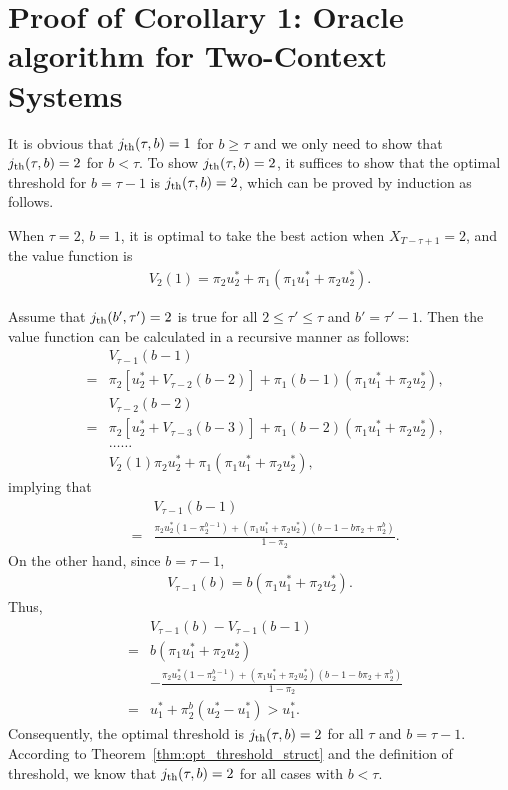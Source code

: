 \section{Proof of Corollary 1: Oracle algorithm for Two-Context Systems}\label{app:proof_opt_two_context}
It is obvious that $j_{\rm th}(\tau, b) = 1$  for $b\geq \tau$ and we only need to show that $j_{\rm th}(\tau, b) = 2$ for $b < \tau$.
To show $j_{\rm th}(\tau, b) = 2$, it suffices to show that the optimal threshold for $b = \tau -1$ is $j_{\rm th}(\tau, b) = 2$,
which can be proved by induction as follows.

When $\tau = 2$, $b = 1$, it is optimal to take the best action when $X_{T-\tau + 1} = 2$, and the value function is
\begin{eqnarray}
V_2(1) = \pi_2 u_2^* + \pi_1(\pi_1 u_1^* + \pi_2 u_2^*).
\end{eqnarray}

Assume that $j_{\rm th}(b', \tau') = 2$ is true for all $2 \leq \tau' \leq \tau$ and $b' = \tau' - 1$.
Then the value function can be calculated in a recursive manner as follows:
\begin{eqnarray}
&& V_{\tau-1}(b-1) \nonumber \\
&=&  \pi_2[u_2^* + V_{\tau-2}(b-2)] + \pi_1 (b-1)(\pi_1 u_1^* + \pi_2 u_2^*),\nonumber\\
&& V_{\tau-2}(b-2) \nonumber \\
&=&  \pi_2[u_2^* + V_{\tau-3}(b-3)] + \pi_1 (b-2)(\pi_1 u_1^* + \pi_2 u_2^*),\nonumber\\
&&\ldots \ldots \nonumber\\
&&V_2(1)  \pi_2 u_2^* + \pi_1(\pi_1 u_1^* + \pi_2 u_2^*),\nonumber
\end{eqnarray}
implying that
\begin{eqnarray}
&&V_{\tau-1}(b-1) \nonumber \\
&=&  \frac{\pi_2 u_2^*(1 - \pi_2^{b-1}) + (\pi_1 u_1^* + \pi_2 u_2^*)(b-1 -b\pi_2 + \pi_2^b)}{1 - \pi_2}. \nonumber
\end{eqnarray}
On the other hand, since $b = \tau -1$,
\begin{eqnarray}
V_{\tau-1}(b) = b(\pi_1 u_1^* + \pi_2 u_2^*).
\end{eqnarray}
Thus,
\begin{eqnarray}
&&{V_{\tau-1}(b) - V_{\tau-1}(b-1)} \nonumber \\
&=&  b(\pi_1 u_1^* + \pi_2 u_2^*) \nonumber \\
&&- \frac{\pi_2 u_2^*(1 - \pi_2^{b-1})   + (\pi_1 u_1^* + \pi_2 u_2^*)(b-1 -b\pi_2 + \pi_2^b)}{1 - \pi_2}\nonumber \\
&= &{ u_1^* + \pi_2^b(u_2^* - u_1^*) > u_1^*.}
\end{eqnarray}
Consequently, the optimal threshold  is $j_{\rm th}(\tau, b) = 2$ for all $\tau$ and $b = \tau -1$. According to Theorem~\ref{thm:opt_threshold_struct} and the definition of threshold, we know that $j_{\rm th}(\tau, b) = 2$  for all  cases with
$b < \tau$.